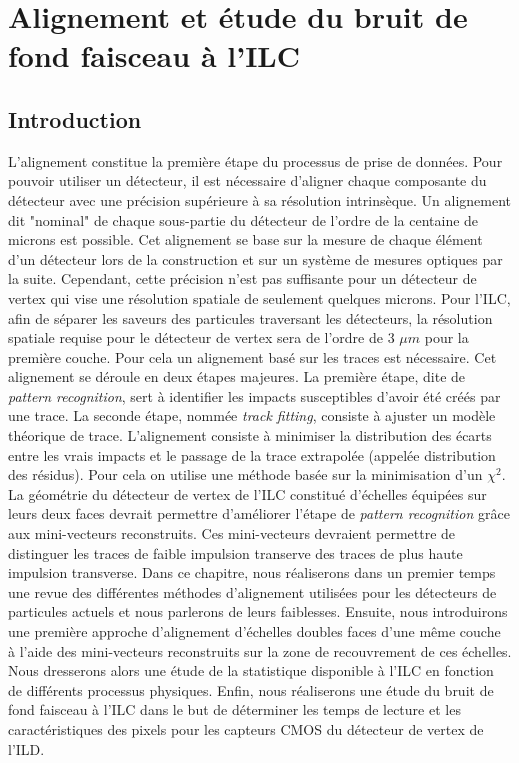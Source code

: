 \chapter{Alignement et \'etude du bruit de fond faisceau \`a l'ILC}
\label{chap:alignement}

\section{Introduction}

  L'alignement constitue la premi\`ere \'etape du processus de prise de donn\'ees. Pour pouvoir utiliser un détecteur, il est nécessaire d'aligner chaque composante du détecteur avec une précision supérieure à sa résolution intrinsèque. Un alignement dit "nominal" de chaque sous-partie du détecteur de l'ordre de la centaine de microns est possible. Cet alignement se base sur la mesure de chaque \'el\'ement d'un d\'etecteur lors de la construction et sur un syst\`eme de mesures optiques par la suite. Cependant, cette précision n'est pas suffisante pour un détecteur de vertex qui vise une résolution spatiale de seulement quelques microns. Pour l’ILC, afin de s\'eparer les saveurs des particules traversant les d\'etecteurs, la r\'esolution spatiale requise pour le d\'etecteur de vertex sera de l'ordre de 3 $\mu m$ pour la premi\`ere couche. Pour cela un alignement basé sur les traces est nécessaire. Cet alignement se déroule en deux étapes majeures. La première étape, dite de \textit{pattern recognition}, sert à identifier les impacts susceptibles d'avoir été créés par une trace. La seconde étape, nommée \textit{track fitting}, consiste à ajuster un modèle théorique de trace. L'alignement consiste \`a minimiser la distribution des écarts entre les vrais impacts et le passage de la trace extrapolée (appel\'ee distribution des r\'esidus). Pour cela on utilise une méthode basée sur la minimisation d'un $\chi^2$. La g\'eom\'etrie du détecteur de vertex de l'ILC constitu\'e d'\'echelles \'equipées sur leurs deux faces devrait permettre d'am\'eliorer l'\'etape de \textit{pattern recognition} grâce aux mini-vecteurs reconstruits. Ces mini-vecteurs devraient permettre de distinguer les traces de faible impulsion transerve des traces de plus haute impulsion transverse. Dans ce chapitre, nous r\'ealiserons dans un premier temps une revue des diff\'erentes m\'ethodes d'alignement utilis\'ees pour les d\'etecteurs de particules actuels et nous parlerons de leurs faiblesses. Ensuite, nous introduirons une premi\`ere approche d'alignement d'\'echelles doubles faces d'une m\^eme couche \`a l'aide des mini-vecteurs reconstruits sur la zone de recouvrement de ces \'echelles. Nous dresserons alors une \'etude de la statistique disponible \`a l'ILC en fonction de diff\'erents processus physiques. Enfin, nous r\'ealiserons une \'etude du bruit de fond faisceau \`a l'ILC dans le but de d\'eterminer les temps de lecture et les caract\'eristiques des pixels pour les capteurs CMOS du d\'etecteur de vertex de l'ILD.
  
